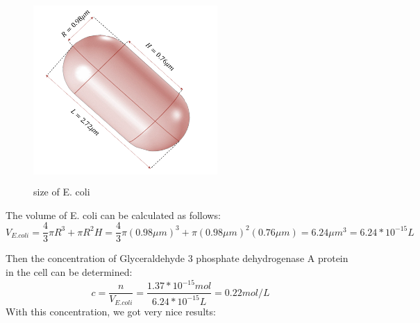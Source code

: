 \begin{figure}[!htbp]
	\centering
	\includegraphics[width=7cm,height=7cm]{dc}
	\caption{size of E. coli}
\end{figure}

The volume of E. coli can be calculated as follows:
\begin{displaymath}
V_{E.coli}=\frac{4}{3} \pi R^3+\pi R^2H=\frac{4}{3} \pi (0.98\mu m)^3+\pi (0.98\mu m)^2(0.76\mu m)=6.24\mu m^3=6.24*10^{-15}L
\end{displaymath}

Then the concentration of Glyceraldehyde 3 phosphate dehydrogenase A protein in the cell can be determined:
\begin{displaymath}
c=\frac{n}{V_{E.coli}}=\frac{1.37*10^{-15}mol}{6.24*10^{-15}L}=0.22mol/L
\end{displaymath}
With this concentration, we got very nice results:

